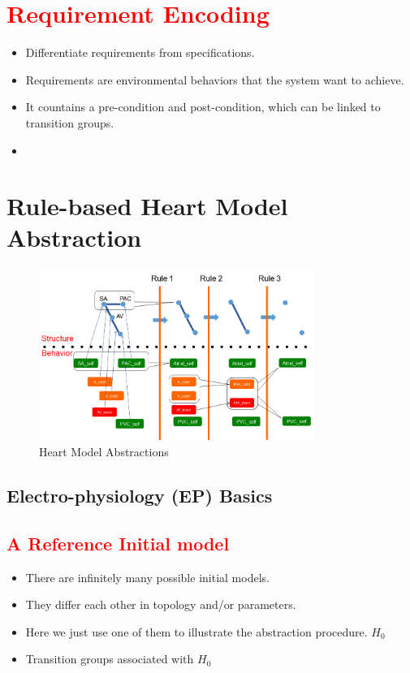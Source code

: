 \documentclass{llncs}
\begin{document}
\section{\textcolor{red}{Requirement Encoding}}
\begin{itemize}
	\item Differentiate requirements from specifications.
    \item Requirements are environmental behaviors that the system want to achieve.
    \item It countains a pre-condition and post-condition, which can be linked to transition groups.
    \item 
\end{itemize}



\section{Rule-based Heart Model Abstraction}
\begin{figure}[!t]
		\centering
		\includegraphics[width=0.8\textwidth]{figs/HM_abs.png}
		\caption{\small Heart Model Abstractions}
		\label{fig:abs}
\end{figure}
\subsection{Electro-physiology (EP) Basics}
\subsection{\textcolor{red}{A Reference Initial model}}
\begin{itemize}
	\item There are infinitely many possible initial models.
    \item They differ each other in topology and/or parameters.
    \item Here we just use one of them to illustrate the abstraction procedure. $H_0$
    \item Transition groups associated with $H_0$
\end{itemize}
\end{document}
